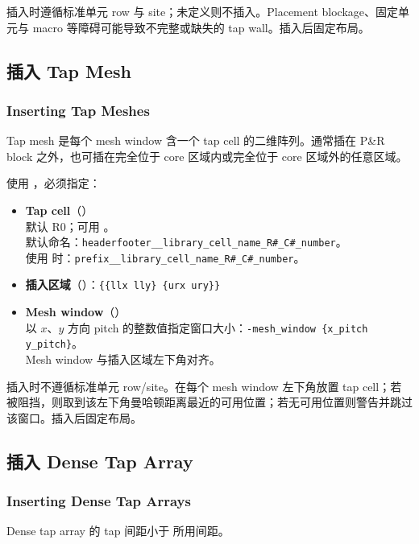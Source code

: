 插入时遵循标准单元 row 与 site；未定义则不插入。Placement blockage、固定单元与 macro 等障碍可能导致不完整或缺失的 tap wall。插入后固定布局。

\subsection{插入 Tap Mesh}
\subsubsection*{Inserting Tap Meshes}

Tap mesh 是每个 mesh window 含一个 tap cell 的二维阵列。通常插在 P\&R block 之外，也可插在完全位于 core 区域内或完全位于 core 区域外的任意区域。

使用 ，必须指定：
\begin{itemize}
  \item \textbf{Tap cell}（）\\
        默认 R0；可用 。\\
        默认命名：\texttt{headerfooter\_\_library\_cell\_name\_R\#\_C\#\_number}。\\
        使用  时：\texttt{prefix\_\_library\_cell\_name\_R\#\_C\#\_number}。
  \item \textbf{插入区域}（）：\texttt{\{\{llx lly\} \{urx ury\}\}}
  \item \textbf{Mesh window}（）\\
        以 $x$、$y$ 方向 pitch 的整数值指定窗口大小：\texttt{-mesh\_window \{x\_pitch y\_pitch\}}。\\
        Mesh window 与插入区域左下角对齐。
\end{itemize}

插入时不遵循标准单元 row/site。在每个 mesh window 左下角放置 tap cell；若被阻挡，则取到该左下角曼哈顿距离最近的可用位置；若无可用位置则警告并跳过该窗口。插入后固定布局。

\subsection{插入 Dense Tap Array}
\subsubsection*{Inserting Dense Tap Arrays}

Dense tap array 的 tap 间距小于  所用间距。

